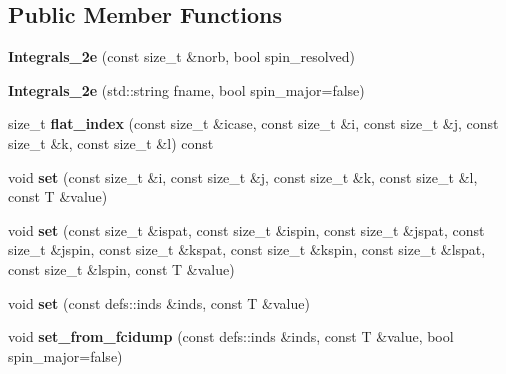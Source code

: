 \subsection*{Public Member Functions}
\begin{DoxyCompactItemize}
\item 
{\bfseries Integrals\+\_\+2e} (const size\+\_\+t \&norb, bool spin\+\_\+resolved)\hypertarget{classIntegrals__2e_a454976ff75afcf581fe352823ecafe8f}{}\label{classIntegrals__2e_a454976ff75afcf581fe352823ecafe8f}

\item 
{\bfseries Integrals\+\_\+2e} (std\+::string fname, bool spin\+\_\+major=false)\hypertarget{classIntegrals__2e_a2ecd958fb6145c1f07e01cac3593f996}{}\label{classIntegrals__2e_a2ecd958fb6145c1f07e01cac3593f996}

\item 
size\+\_\+t {\bfseries flat\+\_\+index} (const size\+\_\+t \&icase, const size\+\_\+t \&i, const size\+\_\+t \&j, const size\+\_\+t \&k, const size\+\_\+t \&l) const \hypertarget{classIntegrals__2e_a92baf60ef11d6fd32471a8c0ca95e34f}{}\label{classIntegrals__2e_a92baf60ef11d6fd32471a8c0ca95e34f}

\item 
void {\bfseries set} (const size\+\_\+t \&i, const size\+\_\+t \&j, const size\+\_\+t \&k, const size\+\_\+t \&l, const T \&value)\hypertarget{classIntegrals__2e_ad115da57764ce79665e42223a192fb5d}{}\label{classIntegrals__2e_ad115da57764ce79665e42223a192fb5d}

\item 
void {\bfseries set} (const size\+\_\+t \&ispat, const size\+\_\+t \&ispin, const size\+\_\+t \&jspat, const size\+\_\+t \&jspin, const size\+\_\+t \&kspat, const size\+\_\+t \&kspin, const size\+\_\+t \&lspat, const size\+\_\+t \&lspin, const T \&value)\hypertarget{classIntegrals__2e_a42785b238af5bb7d94bd89d05f6be5bc}{}\label{classIntegrals__2e_a42785b238af5bb7d94bd89d05f6be5bc}

\item 
void {\bfseries set} (const defs\+::inds \&inds, const T \&value)\hypertarget{classIntegrals__2e_aae87cd8a02d77a16fe03ddb5dfb83870}{}\label{classIntegrals__2e_aae87cd8a02d77a16fe03ddb5dfb83870}

\item 
void {\bfseries set\+\_\+from\+\_\+fcidump} (const defs\+::inds \&inds, const T \&value, bool spin\+\_\+major=false)\hypertarget{classIntegrals__2e_adb1a52bac2013c5873ef7c27136506a1}{}\label{classIntegrals__2e_adb1a52bac2013c5873ef7c27136506a1}


\end{DoxyCompactItemize}

